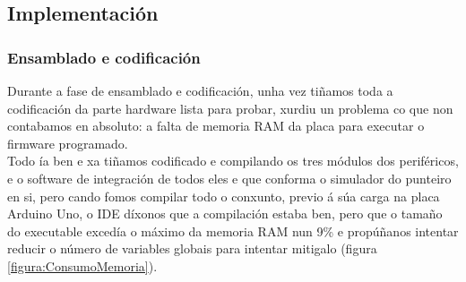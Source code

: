  \subsection{Implementación}
 
  \subsubsection{Ensamblado e codificación}
  
   Durante a fase de ensamblado e codificación, unha vez tiñamos toda a
   codificación da parte hardware lista para probar, xurdiu un problema co que
   non contabamos en absoluto: a falta de memoria RAM da placa para executar o
   firmware programado. \\
   
   Todo ía ben e xa tiñamos codificado e compilando os tres módulos dos
   periféricos, e o software de integración de todos eles e que conforma o
   simulador do punteiro en si, pero cando fomos compilar todo o conxunto,
   previo á súa carga na placa Arduino Uno, o IDE díxonos que a compilación
   estaba ben, pero que o tamaño do executable excedía o máximo da memoria RAM
   nun 9\% e propúñanos intentar reducir o número de variables globais para
   intentar mitigalo (figura \ref{figura:ConsumoMemoria}). \\
   
